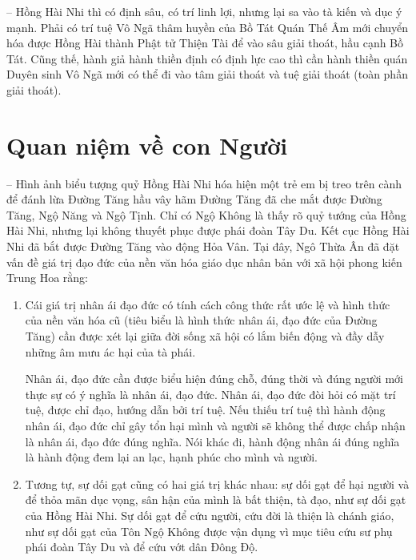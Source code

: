 -- Hồng Hài Nhi thì có định sâu, có trí linh lợi, nhưng lại sa vào tà kiến và dục ý mạnh. Phải có trí tuệ Vô Ngã thâm huyền của Bồ Tát Quán Thế Âm mới chuyển hóa được Hồng Hài thành Phật tử Thiện Tài để vào sâu giải thoát, hầu cạnh Bồ Tát. Cũng thế, hành giả hành thiền định có định lực cao thì cần hành thiền quán Duyên sinh Vô Ngã mới có thể đi vào tâm giải thoát và tuệ giải thoát (toàn phần giải thoát).

\section{Quan niệm về con Người} %
\label{sec:40_41_con_nguoi}


-- Hình ảnh biểu tượng quỷ Hồng Hài Nhi hóa hiện một trẻ em bị treo trên cành để đánh lừa Đường Tăng hầu vây hãm Đường Tăng đã che mắt được Đường Tăng, Ngộ Năng và Ngộ Tịnh. Chỉ có Ngộ Không là thấy rõ quỷ tướng của Hồng Hài Nhi, nhưng lại không thuyết phục được phái đoàn Tây Du. Kết cục Hồng Hài Nhi đã bắt được Đường Tăng vào động Hỏa Vân. Tại đây, Ngô Thừa Ân đã đặt vấn đề giá trị đạo đức của nền văn hóa giáo dục nhân bản với xã hội phong kiến Trung Hoa rằng:

\begin{enumerate}[label=\itshape\arabic*\upshape/]
   \item Cái giá trị nhân ái đạo đức có tính cách công thức rất ước lệ và hình thức của nền văn hóa cũ (tiêu biểu là hình thức nhân ái, đạo đức của Đường Tăng) cần được xét lại giữa đời sống xã hội có lắm biến động và đầy dẫy những âm mưu ác hại của tà phái.

   Nhân ái, đạo đức cần được biểu hiện đúng chỗ, đúng thời và đúng người mới thực sự có ý nghĩa là nhân ái, đạo đức. Nhân ái, đạo đức đòi hỏi có mặt trí tuệ, được chỉ đạo, hướng dẫn bởi trí tuệ. Nếu thiếu trí tuệ thì hành động nhân ái, đạo đức chỉ gây tổn hại mình và người sẽ không thể được chấp nhận là nhân ái, đạo đức đúng nghĩa. Nói khác đi, hành động nhân ái đúng nghĩa là hành động đem lại an lạc, hạnh phúc cho mình và người.

    \item Tương tự, sự dối gạt cũng có hai giá trị khác nhau: sự dối gạt để hại người và để thỏa mãn dục vọng, sân hận của mình là bất thiện, tà đạo, như sự dối gạt của Hồng Hài Nhi. Sự dối gạt để cứu người, cứu đời là thiện là chánh giáo, như sự dối gạt của Tôn Ngộ Không được vận dụng vì mục tiêu cứu sư phụ phái đoàn Tây Du và để cứu vớt dân Đông Độ.
\end{enumerate}

